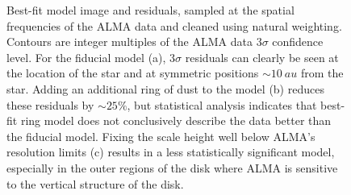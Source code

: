 \documentclass[12pt,oneside]{book}
\begin{document}
\begin{figure}
  \centering
  
  \qquad
    
  \qquad

  \qquad
    
  \caption{Best-fit model image and residuals, sampled at the spatial frequencies of the ALMA data and cleaned using natural weighting. 
  Contours are integer multiples of the ALMA data $3\sigma$ confidence level. 
  For the fiducial model (a), $3\sigma$ residuals can clearly be seen at the location of the star and at symmetric positions $\sim \SI{10}{au}$ from the star. 
  Adding an additional ring of dust to the model (b) reduces these residuals by $\sim 25 \%$, but statistical analysis indicates that best-fit ring model does not conclusively describe the data better than the fiducial model.
  Fixing the scale height well below ALMA's resolution limits (c) results in a less statistically significant model, especially in the outer regions of the disk where ALMA is sensitive to the vertical structure of the disk.}
\end{figure}
\end{document}
